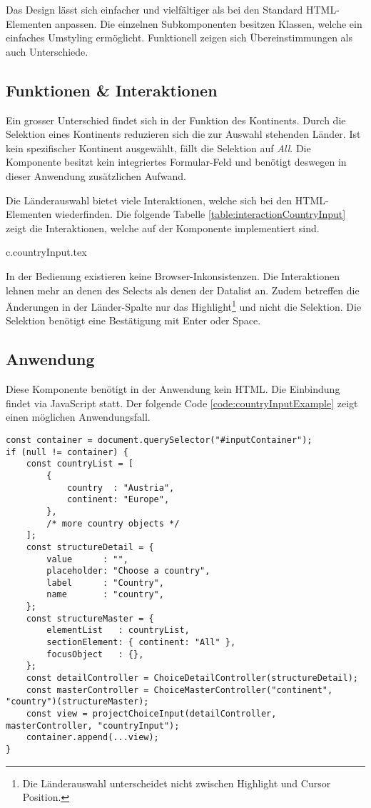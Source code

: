 Das Design lässt sich einfacher und vielfältiger als bei den Standard HTML-Elementen anpassen. 
Die einzelnen Subkomponenten besitzen Klassen, welche ein einfaches Umstyling ermöglicht. 
Funktionell zeigen sich Übereinstimmungen als auch Unterschiede. 


\subsection{Funktionen \& Interaktionen}
\label{sec:countryChoiceFunction}

Ein grosser Unterschied findet sich in der Funktion des Kontinents. 
Durch die Selektion eines Kontinents reduzieren sich die zur Auswahl stehenden Länder. 
Ist kein spezifischer Kontinent ausgewählt, fällt die Selektion auf \emph{All}. 
Die Komponente besitzt kein integriertes Formular-Feld und benötigt deswegen in dieser Anwendung zusätzlichen Aufwand. 

Die Länderauswahl bietet viele Interaktionen, welche sich bei den HTML-Elementen wiederfinden. 
Die folgende Tabelle \ref{table:interactionCountryInput} zeigt die Interaktionen, welche auf der Komponente implementiert sind. 

{c.countryInput.tex}

In der Bedienung existieren keine Browser-Inkonsistenzen. 
Die Interaktionen lehnen mehr an denen des Selects als denen der Datalist an. 
Zudem betreffen die Änderungen in der Länder-Spalte nur das Highlight\footnote{
    Die Länderauswahl unterscheidet nicht zwischen Highlight und Cursor Position. 
} und nicht die Selektion. 
Die Selektion benötigt eine Bestätigung mit Enter oder Space. 

\subsection{Anwendung}
\label{sec:countryChoiceUse}

Diese Komponente benötigt in der Anwendung kein HTML. 
Die Einbindung findet via JavaScript statt. 
Der folgende Code \ref{code:countryInputExample} zeigt einen möglichen Anwendungsfall. 

\begin{lstlisting}[style = htmlcssjs, caption = Länderauswahl Beispiel, label = code:countryInputExample]
const container = document.querySelector("#inputContainer");
if (null != container) {
    const countryList = [
        {
            country  : "Austria",
            continent: "Europe",
        },
        /* more country objects */
    ];
    const structureDetail = {
        value      : "",
        placeholder: "Choose a country",
        label      : "Country",
        name       : "country",
    };
    const structureMaster = {
        elementList   : countryList,
        sectionElement: { continent: "All" },
        focusObject   : {},
    };
    const detailController = ChoiceDetailController(structureDetail);
    const masterController = ChoiceMasterController("continent", "country")(structureMaster);
    const view = projectChoiceInput(detailController, masterController, "countryInput");
    container.append(...view);
}
\end{lstlisting}

